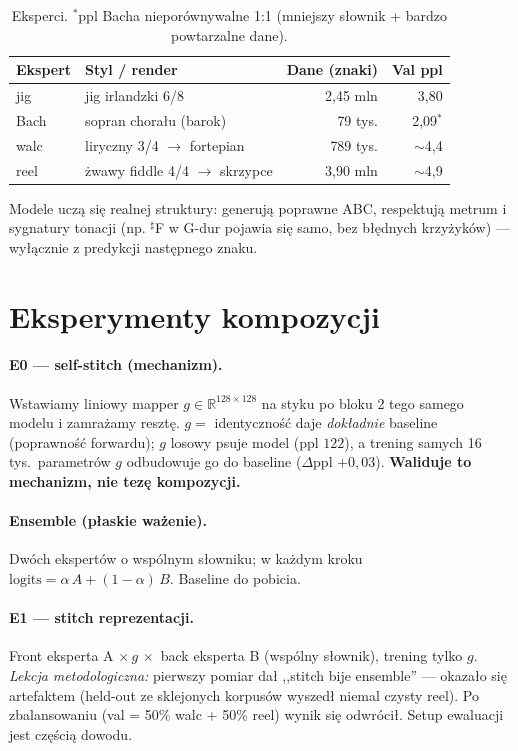 \documentclass[11pt]{article}
\begin{document}
\begin{table}[h]
\centering
\begin{tabular}{llrr}
\toprule
Ekspert & Styl / render & Dane (znaki) & Val ppl \\
\midrule
jig    & jig irlandzki 6/8           & 2{,}45 mln & 3{,}80 \\
Bach   & sopran chorału (barok)      & 79 tys.    & 2{,}09$^\ast$ \\
walc   & liryczny 3/4 $\to$ fortepian & 789 tys.  & $\sim$4{,}4 \\
reel   & żwawy fiddle 4/4 $\to$ skrzypce & 3{,}90 mln & $\sim$4{,}9 \\
\bottomrule
\end{tabular}
\caption{Eksperci. $^\ast$ppl Bacha nieporównywalne 1:1 (mniejszy słownik + bardzo powtarzalne dane).}
\end{table}

Modele uczą się realnej struktury: generują poprawne ABC, respektują metrum i sygnatury tonacji (np. $^\sharp$F
w G-dur pojawia się samo, bez błędnych krzyżyków) --- wyłącznie z predykcji następnego znaku.

\section{Eksperymenty kompozycji}
\paragraph{E0 --- self-stitch (mechanizm).} Wstawiamy liniowy mapper $g\in\mathbb{R}^{128\times128}$ na styku po
bloku 2 tego samego modelu i zamrażamy resztę. $g=$ identyczność daje \emph{dokładnie} baseline (poprawność
forwardu); $g$ losowy psuje model (ppl $122$), a trening samych 16 tys.\ parametrów $g$ odbudowuje go do
baseline ($\Delta$ppl $+0{,}03$). \textbf{Waliduje to mechanizm, nie tezę kompozycji.}

\paragraph{Ensemble (płaskie ważenie).} Dwóch ekspertów o wspólnym słowniku; w każdym kroku
$\text{logits}=\alpha\,A + (1-\alpha)\,B$. Baseline do pobicia.

\paragraph{E1 --- stitch reprezentacji.} Front eksperta A $\times\, g \,\times$ back eksperta B (wspólny słownik),
trening tylko $g$. \emph{Lekcja metodologiczna:} pierwszy pomiar dał ,,stitch bije ensemble'' --- okazało się
artefaktem (held-out ze sklejonych korpusów wyszedł niemal czysty reel). Po zbalansowaniu (val = 50\% walc +
50\% reel) wynik się odwrócił. Setup ewaluacji jest częścią dowodu.
\end{document}
